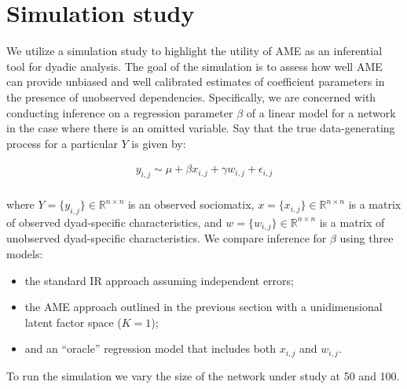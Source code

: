 \section{Simulation study}

We utilize a simulation study to highlight the utility of AME as an inferential tool for dyadic analysis. The goal of the simulation is to assess how well AME can provide unbiased and well calibrated estimates of coefficient parameters in the presence of unobserved dependencies. Specifically, we are concerned with conducting inference on a regression parameter $\beta$ of a linear model for a network in the case where there is an omitted variable. Say that the true data-generating process for a particular $Y$ is given by:

\begin{align*}
	y_{i,j} \sim  \mu + \beta x_{i,j} + \gamma w_{i,j} + \epsilon_{i,j} \\
	\label{eqn:sim}
\end{align*}

where $Y= \{y_{i,j}\}\in \mathbb R^{n\times n}$ is an observed sociomatix, $x = \{x_{i,j} \} \in \mathbb R^{n \times n}$ is a matrix of observed dyad-specific characteristics, and $w = \{ w_{i,j}\} \in \mathbb R^{n \times n}$ is a matrix of unobserved dyad-specific characteristics. We compare inference for $\beta$ using three models:

\begin{itemize}
	\item the standard IR approach assuming independent errors; 
	\item the AME approach outlined in the previous section with a unidimensional latent factor space ($K=1$);
	\item and an ``oracle'' regression model that includes both $x_{i,j}$ and $w_{i,j}$. 
\end{itemize}

To run the simulation we vary the size of the network under study at 50 and 100.

